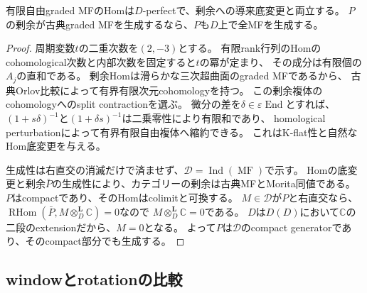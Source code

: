 \begin{lemma}[MF Homの有限縮約と生成子の持上げ]\label{fdw:lem:mf}
有限自由graded MFのHomは$D$-perfectで、剰余への導来底変更と両立する。
$P$の剰余が古典graded MFを生成するなら、$P$も$D$上で全MFを生成する。
\end{lemma}
\begin{proof}
周期変数$t$の二重次数を$(2,-3)$とする。
有限rank行列のHomのcohomological次数と内部次数を固定すると$t$の冪が定まり、
その成分は有限個の$A_j$の直和である。
剰余Homは滑らかな三次超曲面のgraded MFであるから、
古典Orlov比較によって有界有限次元cohomologyを持つ\cite{Orlov}。
この剰余複体のcohomologyへのsplit contractionを選ぶ。
微分の差を$\delta\in\varepsilon\operatorname{End}$とすれば、
$(1+s\delta)^{-1}$と$(1+\delta s)^{-1}$は二乗零性により有限和であり、
homological perturbationによって有界有限自由複体へ縮約できる。
これはK-flat性と自然なHom底変更を与える。

生成性は右直交の消滅だけで済ませず、$\mathcal D=\operatorname{Ind}(\operatorname{MF})$で示す。
Homの底変更と剰余$\bar P$の生成性により、カテゴリーの剰余は古典MFとMorita同値である。
$P$はcompactであり、そのHomはcolimitと可換する。
$M\in\mathcal D$が$P$と右直交なら、
$\operatorname{RHom}(\bar P,M\otimes_D^{\mathbf L}\mathbb C)=0$なので
$M\otimes_D^{\mathbf L}\mathbb C=0$である。
$D$は$D(D)$において$\mathbb C$の二段のextensionだから、$M=0$となる。
よって$P$は$\mathcal D$のcompact generatorであり、そのcompact部分でも生成する。
\end{proof}

\subsection{windowとrotationの比較}

